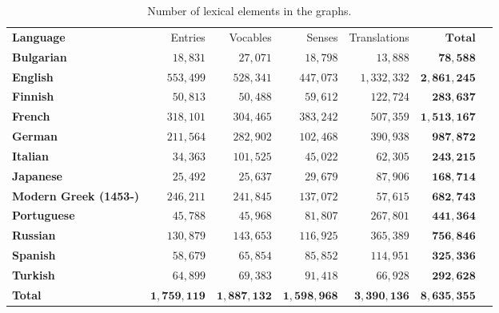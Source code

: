 \documentclass[10pt, a4paper]{article}
\begin{document}
\begin{table}[htb]
\begin{minipage}{\linewidth}
\begin{small}
\begin{tabular}{lrrrrrr}
\hline
\textbf{Language} & Entries & Vocables & Senses & Translations & $\mathbf{Total}$ \\
\textbf{Bulgarian} & $18,831$ & $27,071$ & $18,798$ & $13,888$ & $\mathbf{78,588}$ \\
\textbf{English} & $553,499$ & $528,341$ & $447,073$ & $1,332,332$ & $\mathbf{2,861,245}$ \\
\textbf{Finnish} & $50,813$ & $50,488$ & $59,612$ & $122,724$ & $\mathbf{283,637}$ \\
\textbf{French} & $318,101$ & $304,465$ & $383,242$ & $507,359$ & $\mathbf{1,513,167}$ \\
\textbf{German} & $211,564$ & $282,902$ & $102,468$ & $390,938$ & $\mathbf{987,872}$ \\
\textbf{Italian} & $34,363$ & $101,525$ & $45,022$ & $62,305$ & $\mathbf{243,215}$ \\
\textbf{Japanese} & $25,492$ & $25,637$ & $29,679$ & $87,906$ & $\mathbf{168,714}$ \\
\textbf{Modern Greek (1453-)} & $246,211$ & $241,845$ & $137,072$ & $57,615$ & $\mathbf{682,743}$ \\
\textbf{Portuguese} & $45,788$ & $45,968$ & $81,807$ & $267,801$ & $\mathbf{441,364}$ \\
\textbf{Russian} & $130,879$ & $143,653$ & $116,925$ & $365,389$ & $\mathbf{756,846}$ \\
\textbf{Spanish} & $58,679$ & $65,854$ & $85,852$ & $114,951$ & $\mathbf{325,336}$ \\
\textbf{Turkish} & $64,899$ & $69,383$ & $91,418$ & $66,928$ & $\mathbf{292,628}$ \\
\textbf{Total} & $\mathbf{1,759,119}$ & $\mathbf{1,887,132}$ & $\mathbf{1,598,968}$ & $\mathbf{3,390,136}$ & $\mathbf{8,635,355}$ \\
\end{tabular}
\end{small}
\end{minipage}
\caption{Number of lexical elements in the graphs.}
\label{table:size}
\end{table}
\end{document}
